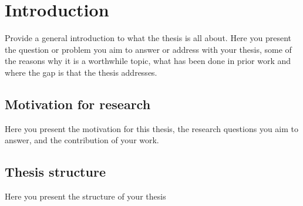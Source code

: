 \chapter{Introduction}
\label{sec:Introduction}

Provide a general introduction to what the thesis is all about. Here you present the question or problem you aim to answer or address with your thesis, some of the reasons why it is a worthwhile topic, what has been done in prior work and where the gap is that the thesis addresses.

\section{Motivation for research}
Here you present the motivation for this thesis, the research questions you aim to answer, and the contribution of your work.
\section {Thesis structure}
Here you present the structure of your thesis